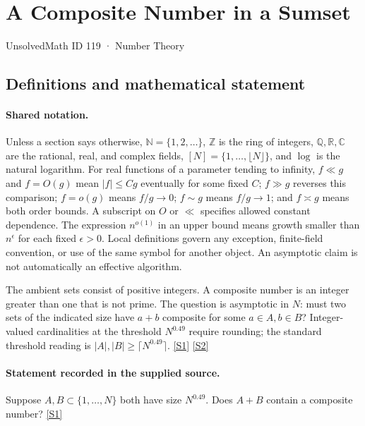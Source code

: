 \documentclass[11pt,a4paper]{article}
\newcommand{\N}{\mathbb{N}}
\newcommand{\Z}{\mathbb{Z}}
\newcommand{\Q}{\mathbb{Q}}
\newcommand{\R}{\mathbb{R}}
\newcommand{\C}{\mathbb{C}}
\newcommand{\sref}[2]{\hyperlink{source:#1:#2}{[S#2]}}
\begin{document}

\setcounter{section}{118}

\section{A Composite Number in a Sumset}\label{119}

{\small\sffamily UnsolvedMath ID 119 · Number Theory}

\subsection{Definitions and mathematical statement}

\paragraph{Shared notation.}Unless a section says otherwise, $\N=\{1,2,\ldots\}$,
$\Z$ is the ring of integers, $\Q,\R,\C$ are the rational, real, and complex
fields, $[N]=\{1,\ldots,\lfloor N\rfloor\}$, and $\log$ is the natural
logarithm. For real functions of a parameter tending to infinity,
$f\ll g$ and $f=O(g)$ mean $|f|\leq Cg$ eventually for some fixed $C$;
$f\gg g$ reverses this comparison; $f=o(g)$ means $f/g\to0$;
$f\sim g$ means $f/g\to1$; and $f\asymp g$ means both order bounds.
A subscript on $O$ or $\ll$ specifies allowed constant dependence.
The expression $n^{o(1)}$ in an upper bound means growth smaller than
$n^\epsilon$ for each fixed $\epsilon>0$. Local definitions govern any
exception, finite-field convention, or use of the same symbol for another
object. An asymptotic claim is not automatically an effective algorithm.



The ambient sets consist of positive integers. A composite number is an integer greater than one that is not prime. The question is asymptotic in $N$: must two sets of the indicated size have $a+b$ composite for some $a\in A,b\in B$? Integer-valued cardinalities at the threshold $N^{0.49}$ require rounding; the standard threshold reading is $|A|,|B|\geq\lceil N^{0.49}\rceil$. \sref{119}{1} \sref{119}{2}

\paragraph{Statement recorded in the supplied source.}
Suppose $A, B \subset \{1, \dots, N\}$ both have size $N^{0.49}$. Does $A + B$ contain a composite number? \sref{119}{1}
\end{document}
